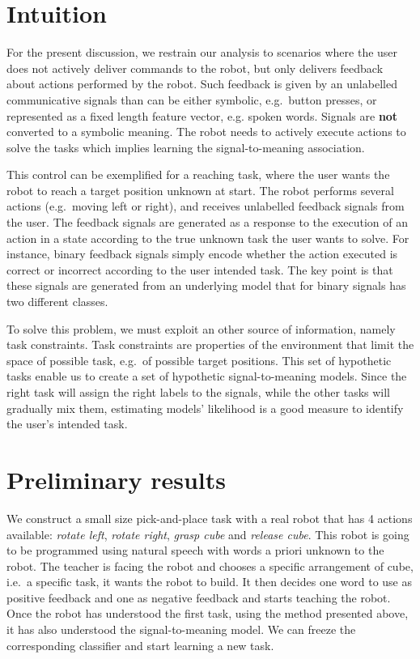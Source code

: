 \documentclass{acm_proc_article-sp}
\begin{document}
\section{Intuition}

For the present discussion, we restrain our analysis to scenarios where the user does not actively deliver commands to the robot, but only delivers feedback about actions performed by the robot. Such feedback is given by an unlabelled communicative signals than can be either symbolic, e.g.\ button presses, or represented as a fixed length feature vector, e.g. spoken words. Signals are \textbf{not} converted to a symbolic meaning. The robot needs to actively execute actions to solve the tasks which implies learning the signal-to-meaning association. 

This control can be exemplified for a reaching task, where the user wants the robot to reach a target position unknown at start. The robot performs several actions (e.g.\ moving left or right), and receives unlabelled feedback signals from the user. The feedback signals are generated as a response to the execution of an action in a state according to the true unknown task the user wants to solve. For instance, binary feedback signals simply encode whether the action executed is correct or incorrect according to the user intended task. The key point is that these signals are generated from an underlying model that for binary signals has two different classes.

To solve this problem, we must exploit an other source of information, namely task constraints. Task constraints are properties of the environment that limit the space of possible task, e.g.\ of possible target positions. This set of hypothetic tasks enable us to create a set of hypothetic signal-to-meaning models. Since the right task will assign the right labels to the signals, while the other tasks will gradually mix them, estimating models' likelihood is a good measure to identify the user's intended task. 

\section{Preliminary results}

We construct a small size pick-and-place task with a real robot that has 4 actions available: \textit{rotate left}, \textit{rotate right}, \textit{grasp cube} and \textit{release cube}. This robot is going to be programmed using natural speech with words a priori unknown to the robot. The teacher is facing the robot and chooses a specific arrangement of cube, i.e.\ a specific task, it wants the robot to build. It then decides one word to use as positive feedback and one as negative feedback and starts teaching the robot. Once the robot has understood the first task, using the method presented above, it has also understood the signal-to-meaning model. We can freeze the corresponding classifier and start learning a new task.
\end{document}
